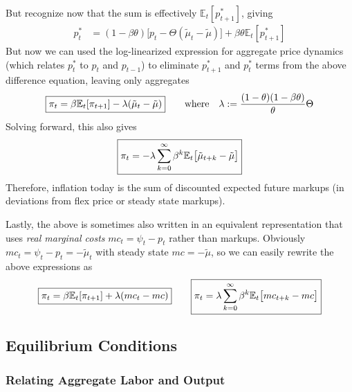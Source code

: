 \documentclass[12pt]{article}
\theoremstyle{plain}
\theoremstyle{definition}
\theoremstyle{remark}
\newcommand{\E}{\mathbb{E}}
\begin{document}
But recognize now that the sum is effectively $\E_t[p_{t+1}^*]$,
giving
\begin{align*}
  p_t^*
  &=
  (1-\beta\theta)
  \big[
  p_{t}
  -
  \Theta
  (
  \tilde{\mu}_{t}
  -\tilde{\mu}
  )
  \big]
  +
  \beta\theta
  \E_t[p_{t+1}^*]
\end{align*}
But now we can used the log-linearized expression for aggregate
price dynamics (which relates $p_t^*$ to $p_t$ and $p_{t-1}$) to
eliminate $p_{t+1}^*$ and $p_t^*$ terms from the above difference
equation, leaving only aggregates
\begin{align*}
  \boxed{%
  \pi_t
  =
  \beta \E_t[\pi_{t+1}]
  -
  \lambda
  (
  \tilde{\mu}_{t}
  -\tilde{\mu}
  )
  }
  \qquad\text{where}\quad
  \lambda :=
  \frac{(1-\theta)(1-\beta\theta)}{\theta}
  \Theta
\end{align*}
Solving forward, this also gives
\begin{align*}
  \boxed{%
  \pi_t
  =
  -\lambda
  \sum_{k=0}^\infty
  \beta^k
  \E_t\big[
  \tilde{\mu}_{t+k}
  -\tilde{\mu}
  \big]
  }
\end{align*}
Therefore, inflation today is the sum of discounted expected future
markups (in deviations from flex price or steady state markups).

Lastly, the above is sometimes also written in an equivalent
representation that uses \emph{real marginal costs}
$mc_t=\psi_t-p_t$ rather than markups. Obviously $mc_t =
\psi_t-p_t=-\tilde{\mu}_t$ with steady state $mc=-\tilde{\mu}$, so
we can easily rewrite the above expressions as
\begin{align*}
  \boxed{%
  \pi_t
  =
  \beta \E_t[\pi_{t+1}]
  +
  \lambda
  (
  mc_t
  - mc
  )
  }
  \qquad
  \boxed{%
  \pi_t
  =
  \lambda
  \sum_{k=0}^\infty
  \beta^k
  \E_t\big[
  mc_{t+k}
  -mc
  \big]
  }
\end{align*}


\clearpage
\subsection{Equilibrium Conditions}

\subsubsection{Relating Aggregate Labor and Output}
\end{document}
